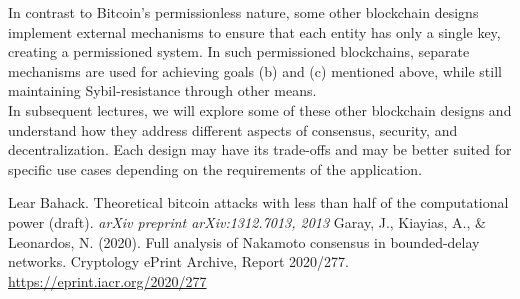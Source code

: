 In contrast to Bitcoin's permissionless nature, some other blockchain designs implement external mechanisms to ensure that each entity has only a single key, creating a permissioned system. In such permissioned blockchains, separate mechanisms are used for achieving goals (b) and (c) mentioned above, while still maintaining Sybil-resistance through other means.\\
In subsequent lectures, we will explore some of these other blockchain designs and understand how they address different aspects of consensus, security, and decentralization. Each design may have its trade-offs and may be better suited for specific use cases depending on the requirements of the application.

\renewcommand{\bibname}{References}
\begin{thebibliography}{9}
	 Lear Bahack. Theoretical bitcoin attacks with less than half of the computational power (draft). \textit{arXiv preprint arXiv:1312.7013, 2013}
	 Garay, J., Kiayias, A., \& Leonardos, N. (2020). Full analysis of Nakamoto consensus in bounded-delay networks. Cryptology ePrint Archive, Report 2020/277. \url{https://eprint.iacr.org/2020/277}
\end{thebibliography}
